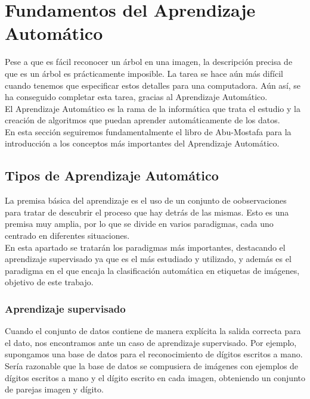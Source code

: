 \section{Fundamentos del Aprendizaje Automático}

Pese a que es fácil reconocer un árbol en una imagen, la descripción precisa de que es un árbol es prácticamente imposible. La tarea se hace aún más difícil cuando tenemos que especificar estos detalles para una computadora. Aún así, se ha conseguido completar esta tarea, gracias al Aprendizaje Automático.\\

El Aprendizaje Automático es la rama de la informática que trata el estudio y la creación de algoritmos que puedan aprender automáticamente de los datos.\\

En esta sección seguiremos fundamentalmente el libro de Abu-Mostafa \cite{Abu-Mostafa:2012:LD:2207825} para la introducción a los conceptos más importantes del Aprendizaje Automático.\\

\subsection{Tipos de Aprendizaje Automático}

La premisa básica del aprendizaje es el uso de un conjunto de oobservaciones para tratar de descubrir el proceso que hay detrás de las mismas. Esto es una premisa muy amplia, por lo que se divide en varios paradigmas, cada uno centrado en diferentes situaciones.\\

En esta apartado se tratarán los paradigmas más importantes, destacando el aprendizaje supervisado ya que es el más estudiado y utilizado, y además es el paradigma en el que encaja la clasificación automática en etiquetas de imágenes, objetivo de este trabajo.\\

\subsubsection{Aprendizaje supervisado}

Cuando el conjunto de datos contiene de manera explícita la salida correcta para el dato, nos encontramos ante un caso de aprendizaje supervisado. Por ejemplo, supongamos una base de datos para el reconocimiento de dígitos escritos a mano. Sería razonable que la base de datos se compusiera de imágenes con ejemplos de dígitos escritos a mano y el dígito escrito en cada imagen, obteniendo un conjunto de parejas imagen y dígito.\\
 
